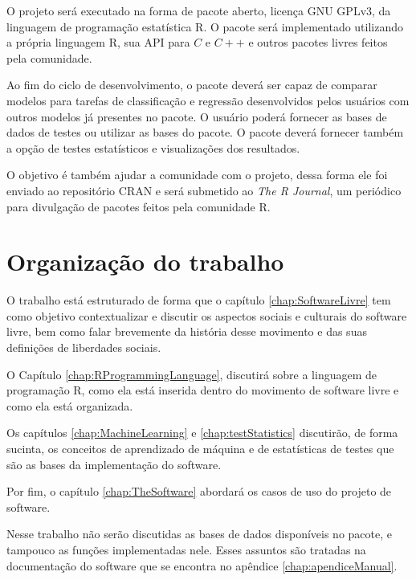 O projeto será executado na forma de pacote aberto, licença GNU GPLv3, da linguagem de programação estatística R. O pacote será implementado utilizando a própria linguagem R, sua API para $C$ e $C++$ e outros pacotes livres feitos pela comunidade.

Ao fim do ciclo de desenvolvimento, o pacote deverá ser capaz de comparar modelos para tarefas de classificação e regressão desenvolvidos pelos usuários com outros modelos já presentes no pacote.  O usuário poderá fornecer as bases de dados de testes ou utilizar as bases do pacote. O pacote deverá fornecer também a opção de testes estatísticos e visualizações dos resultados.

O objetivo é também ajudar a comunidade com o projeto, dessa forma ele foi enviado ao repositório CRAN e será submetido ao \textit{The R Journal}, um periódico para divulgação de pacotes feitos pela comunidade R.


\section{Organização do trabalho}
\label{sec:organizacaoTrabalho}

O trabalho está estruturado de forma que o capítulo \ref{chap:SoftwareLivre} tem como objetivo contextualizar e discutir os aspectos sociais e culturais do software livre, bem como falar brevemente da história desse movimento e das suas definições de liberdades sociais.

O Capítulo \ref{chap:RProgrammingLanguage}, discutirá sobre a linguagem de programação R, como ela está inserida dentro do movimento de software livre e como ela está organizada. 

Os capítulos \ref{chap:MachineLearning} e \ref{chap:testStatistics} discutirão, de forma sucinta, os conceitos de aprendizado de máquina e de estatísticas de testes que são as bases da implementação do software. 

Por fim, o capítulo \ref{chap:TheSoftware} abordará os casos de uso do projeto de software.

Nesse trabalho não serão discutidas as bases de dados disponíveis no pacote, e tampouco as funções implementadas nele. Esses assuntos são tratadas na documentação do software que se encontra no apêndice \ref{chap:apendiceManual}.
